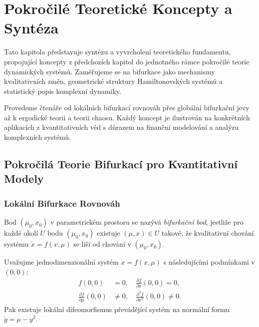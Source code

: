 \section{Pokročilé Teoretické Koncepty a Syntéza}
\label{sec:pokrocile-teoreticke-koncepty}

Tato kapitola představuje syntézu a vyvrcholení teoretického fundamentu, propojující koncepty z předchozích kapitol do jednotného rámce pokročilé teorie dynamických systémů. Zaměřujeme se na bifurkace jako mechanismy kvalitativních změn, geometrické struktury Hamiltonovských systémů a statistický popis komplexní dynamiky.

Provedeme čtenáře od lokálních bifurkací rovnováh přes globální bifurkační jevy až k ergodické teorii a teorii chaosu. Každý koncept je ilustrován na konkrétních aplikacích z kvantitativních věd s důrazem na finanční modelování a analýzu komplexních systémů.


\spc

\subsection{Pokročilá Teorie Bifurkací pro Kvantitativní Modely}

\subsubsection{Lokální Bifurkace Rovnováh}

\begin{definition}
Bod $(\mu_0, x_0)$ v parametrickém prostoru se nazývá \emph{bifurkační bod}, jestliže pro každé okolí $U$ bodu $(\mu_0, x_0)$ existuje $(\mu, x) \in U$ takové, že kvalitativní chování systému $\dot{x} = f(x, \mu)$ se liší od chování v $(\mu_0, x_0)$.
\end{definition}

\begin{theorem}
Uvažujme jednodimenzionální systém $\dot{x} = f(x, \mu)$ s následujícími podmínkami v $(0,0)$:
\begin{align*}
f(0,0) &= 0, \quad \frac{\partial f}{\partial x}(0,0) = 0, \\
\frac{\partial f}{\partial \mu}(0,0) &\neq 0, \quad \frac{\partial^2 f}{\partial x^2}(0,0) \neq 0.
\end{align*}
Pak existuje lokální difeomorfismus převádějící systém na normální formu $\dot{y} = \mu - y^2$.
\end{theorem}

